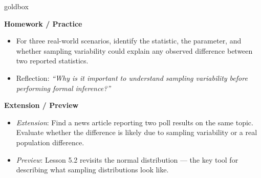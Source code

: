 \documentclass[10pt]{article}
\begin{document}
\begin{skillbox}{goldbox}
\begin{minipage}[t]{0.48\linewidth}
    \textbf{Homework / Practice}
    \begin{itemize}
        \item For three real-world scenarios, identify the statistic, the parameter, and
              whether sampling variability could explain any observed difference between
              two reported statistics.
        \item Reflection: \textit{``Why is it important to understand sampling variability
              before performing formal inference?''}
    \end{itemize}
\end{minipage}
\hfill
\begin{minipage}[t]{0.48\linewidth}
    \textbf{Extension / Preview}
    \begin{itemize}
        \item \textit{Extension}: Find a news article reporting two poll results on the
              same topic. Evaluate whether the difference is likely due to sampling
              variability or a real population difference.
        \item \textit{Preview}: Lesson 5.2 revisits the normal distribution --- the
              key tool for describing what sampling distributions look like.
    \end{itemize}
\end{minipage}
\end{skillbox}
\end{document}
